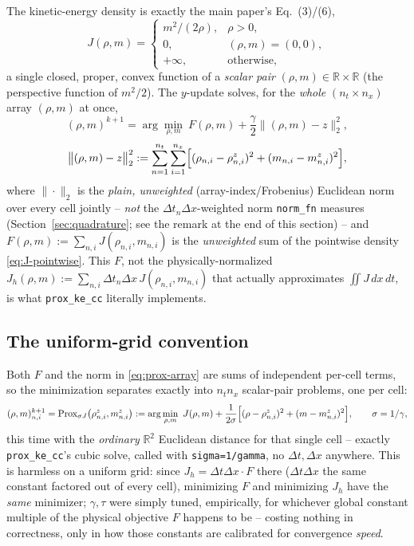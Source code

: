 \documentclass[11pt]{article}
\newcommand{\dt}{\Delta t}
\newcommand{\dx}{\Delta x}
\newcommand{\RR}{\mathbb{R}}
\newcommand{\code}[1]{\texttt{#1}}
\begin{document}
The kinetic-energy density is exactly the main paper's Eq.~(3)/(6),
\begin{equation}
  \label{eq:J-pointwise}
  J(\rho,m) =
  \begin{cases}
    m^2/(2\rho), & \rho>0, \\
    0,           & (\rho,m)=(0,0), \\
    +\infty,     & \text{otherwise},
  \end{cases}
\end{equation}
a single closed, proper, convex function of a \emph{scalar pair} $(\rho,m)\in\RR\times\RR$ (the
perspective function of $m^2/2$). The $y$-update solves, for the \emph{whole} $(n_t\times n_x)$
array $(\rho,m)$ at once,
\begin{equation}
  \label{eq:prox-array}
  (\rho,m)^{k+1} = \arg\min_{\rho,m}\ F(\rho,m) + \frac{\gamma}{2}\bigl\|(\rho,m)-z\bigr\|_2^2,
\end{equation}
\begin{equation}
  \label{eq:prox-array-norm}
  \bigl\|(\rho,m)-z\bigr\|_2^2 := \sum_{n=1}^{n_t}\sum_{i=1}^{n_x}
  \Bigl[(\rho_{n,i}-\rho^z_{n,i})^2 + (m_{n,i}-m^z_{n,i})^2\Bigr],
\end{equation}
where $\|\cdot\|_2$ is the \emph{plain, unweighted} (array-index/Frobenius) Euclidean norm over
every cell jointly -- \emph{not} the $\dt_n\dx$-weighted norm \code{norm\_fn} measures
(Section~\ref{sec:quadrature}; see the remark at the end of this section) -- and
$F(\rho,m):=\sum_{n,i}J(\rho_{n,i},m_{n,i})$ is the \emph{unweighted} sum of the pointwise density
\eqref{eq:J-pointwise}. This $F$, not the physically-normalized
$J_h(\rho,m):=\sum_{n,i}\dt_n\dx\,J(\rho_{n,i},m_{n,i})$ that actually approximates
$\iint J\,dx\,dt$, is what \code{prox\_ke\_cc} literally implements.

\subsection*{The uniform-grid convention}

Both $F$ and the norm in \eqref{eq:prox-array} are sums of independent per-cell terms, so the
minimization separates exactly into $n_t n_x$ scalar-pair problems, one per cell:
\begin{equation}
  \label{eq:prox-uniform}
  (\rho,m)^{k+1}_{n,i} = \mathrm{Prox}_{\sigma J}\bigl(\rho^z_{n,i}, m^z_{n,i}\bigr)
  := \arg\min_{\rho,m}\ J(\rho,m) + \frac{1}{2\sigma}\Bigl[(\rho-\rho^z_{n,i})^2+(m-m^z_{n,i})^2\Bigr],
  \qquad \sigma = 1/\gamma,
\end{equation}
this time with the \emph{ordinary} $\RR^2$ Euclidean distance for that single cell -- exactly
\code{prox\_ke\_cc}'s cubic solve, called with \code{sigma=1/gamma}, no $\dt,\dx$ anywhere. This
is harmless on a uniform grid: since $J_h = \dt\dx\cdot F$ there ($\dt\dx$ the same constant
factored out of every cell), minimizing $F$ and minimizing $J_h$ have the \emph{same} minimizer;
$\gamma,\tau$ were simply tuned, empirically, for whichever global constant multiple of the
physical objective $F$ happens to be -- costing nothing in correctness, only in how those
constants are calibrated for convergence \emph{speed}.
\end{document}
